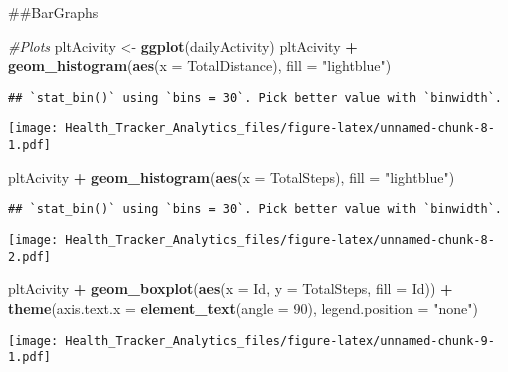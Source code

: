 \documentclass[
]{article}
\newenvironment{Shaded}{\begin{snugshade}}{\end{snugshade}}
\newcommand{\AttributeTok}[1]{\textcolor[rgb]{0.13,0.29,0.53}{#1}}
\newcommand{\CommentTok}[1]{\textcolor[rgb]{0.56,0.35,0.01}{\textit{#1}}}
\newcommand{\DecValTok}[1]{\textcolor[rgb]{0.00,0.00,0.81}{#1}}
\newcommand{\FunctionTok}[1]{\textcolor[rgb]{0.13,0.29,0.53}{\textbf{#1}}}
\newcommand{\NormalTok}[1]{#1}
\newcommand{\OtherTok}[1]{\textcolor[rgb]{0.56,0.35,0.01}{#1}}
\newcommand{\SpecialCharTok}[1]{\textcolor[rgb]{0.81,0.36,0.00}{\textbf{#1}}}
\newcommand{\StringTok}[1]{\textcolor[rgb]{0.31,0.60,0.02}{#1}}
\begin{document}
\#\#BarGraphs

\begin{Shaded}
\begin{Highlighting}[]
\CommentTok{\#Plots}
\NormalTok{pltAcivity }\OtherTok{\textless{}{-}} \FunctionTok{ggplot}\NormalTok{(dailyActivity)}
\NormalTok{pltAcivity }\SpecialCharTok{+} \FunctionTok{geom\_histogram}\NormalTok{(}\FunctionTok{aes}\NormalTok{(}\AttributeTok{x =}\NormalTok{ TotalDistance), }\AttributeTok{fill =} \StringTok{"lightblue"}\NormalTok{)}
\end{Highlighting}
\end{Shaded}

\begin{verbatim}
## `stat_bin()` using `bins = 30`. Pick better value with `binwidth`.
\end{verbatim}

\texttt{[image: Health\_Tracker\_Analytics\_files/figure-latex/unnamed-chunk-8-1.pdf]}

\begin{Shaded}
\begin{Highlighting}[]
\NormalTok{pltAcivity }\SpecialCharTok{+} \FunctionTok{geom\_histogram}\NormalTok{(}\FunctionTok{aes}\NormalTok{(}\AttributeTok{x =}\NormalTok{ TotalSteps), }\AttributeTok{fill =} \StringTok{"lightblue"}\NormalTok{)}
\end{Highlighting}
\end{Shaded}

\begin{verbatim}
## `stat_bin()` using `bins = 30`. Pick better value with `binwidth`.
\end{verbatim}

\texttt{[image: Health\_Tracker\_Analytics\_files/figure-latex/unnamed-chunk-8-2.pdf]}

\begin{Shaded}
\begin{Highlighting}[]
\NormalTok{pltAcivity }\SpecialCharTok{+} 
  \FunctionTok{geom\_boxplot}\NormalTok{(}\FunctionTok{aes}\NormalTok{(}\AttributeTok{x =}\NormalTok{ Id, }\AttributeTok{y =}\NormalTok{ TotalSteps, }\AttributeTok{fill =}\NormalTok{ Id)) }\SpecialCharTok{+} 
  \FunctionTok{theme}\NormalTok{(}\AttributeTok{axis.text.x =} \FunctionTok{element\_text}\NormalTok{(}\AttributeTok{angle =} \DecValTok{90}\NormalTok{), }\AttributeTok{legend.position =} \StringTok{"none"}\NormalTok{) }
\end{Highlighting}
\end{Shaded}

\texttt{[image: Health\_Tracker\_Analytics\_files/figure-latex/unnamed-chunk-9-1.pdf]}
\end{document}
